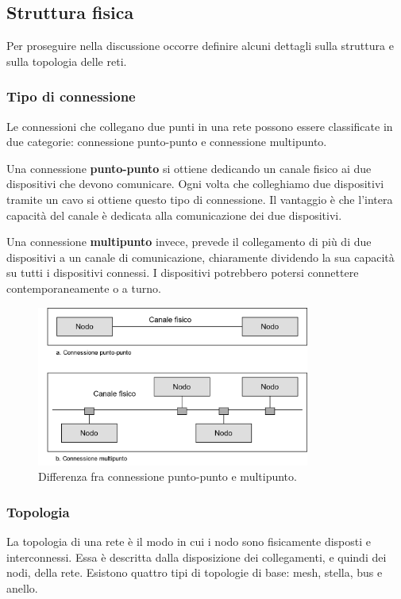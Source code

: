     \subsection{Struttura fisica}
        Per proseguire nella discussione occorre definire alcuni dettagli sulla struttura e sulla topologia delle reti.
        
        \subsubsection{Tipo di connessione}
            Le connessioni che collegano due punti in una rete possono essere classificate in due categorie: connessione punto-punto e connessione multipunto.
            
            Una connessione \textbf{punto-punto} si ottiene dedicando un canale fisico ai due dispositivi che devono comunicare. Ogni volta che colleghiamo due dispositivi tramite un cavo si ottiene questo tipo di connessione. Il vantaggio è che l'intera capacità del canale è dedicata alla comunicazione dei due dispositivi.
            
            Una connessione \textbf{multipunto} invece, prevede il collegamento di più di due dispositivi a un canale di comunicazione, chiaramente dividendo la sua capacità su tutti i dispositivi connessi. I dispositivi potrebbero potersi connettere contemporaneamente o a turno.
            
            \begin{figure}[h]
                \centering
                \includegraphics[width=0.8\textwidth]{img/img1.png}
                \caption{Differenza fra connessione punto-punto e multipunto.}
                \label{fig:img1}
            \end{figure}
            
        \newpage
        \subsubsection{Topologia}
            La topologia di una rete è il modo in cui i nodo sono fisicamente disposti e interconnessi. Essa è descritta dalla disposizione dei collegamenti, e quindi dei nodi, della rete. Esistono quattro tipi di topologie di base: mesh, stella, bus e anello.
            
